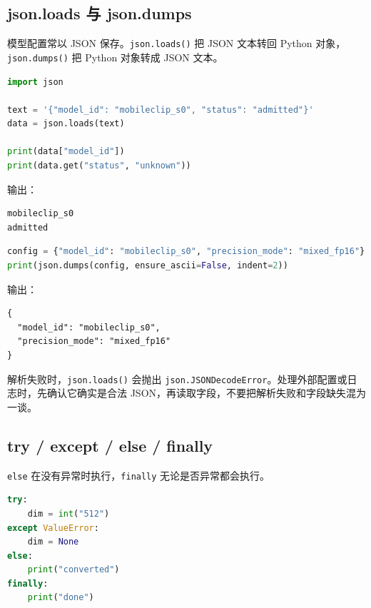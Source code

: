 \subsection{json.loads 与
json.dumps}\label{json.loads-ux4e0e-json.dumps}

模型配置常以 JSON 保存。\passthrough{\lstinline!json.loads()!} 把 JSON
文本转回 Python 对象，\passthrough{\lstinline!json.dumps()!} 把 Python
对象转成 JSON 文本。

\begin{lstlisting}[language=Python]
import json

text = '{"model_id": "mobileclip_s0", "status": "admitted"}'
data = json.loads(text)

print(data["model_id"])
print(data.get("status", "unknown"))
\end{lstlisting}

输出：

\begin{lstlisting}
mobileclip_s0
admitted
\end{lstlisting}

\begin{lstlisting}[language=Python]
config = {"model_id": "mobileclip_s0", "precision_mode": "mixed_fp16"}
print(json.dumps(config, ensure_ascii=False, indent=2))
\end{lstlisting}

输出：

\begin{lstlisting}
{
  "model_id": "mobileclip_s0",
  "precision_mode": "mixed_fp16"
}
\end{lstlisting}

解析失败时，\passthrough{\lstinline!json.loads()!} 会抛出
\passthrough{\lstinline!json.JSONDecodeError!}。处理外部配置或日志时，先确认它确实是合法
JSON，再读取字段，不要把解析失败和字段缺失混为一谈。

\subsection{try / except / else /
finally}\label{try-except-else-finally}

\passthrough{\lstinline!else!}
在没有异常时执行，\passthrough{\lstinline!finally!}
无论是否异常都会执行。

\begin{lstlisting}[language=Python]
try:
    dim = int("512")
except ValueError:
    dim = None
else:
    print("converted")
finally:
    print("done")
\end{lstlisting}

